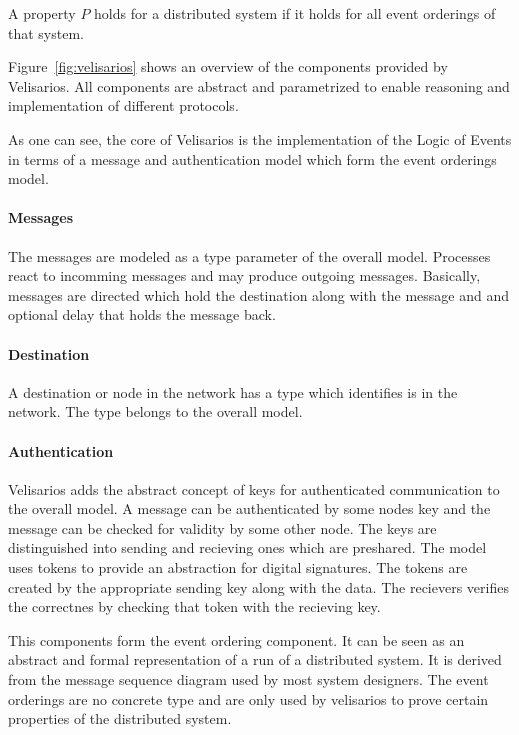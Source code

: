 \begin{defi}
  A property $P$ holds for a distributed system if it holds
  for all event orderings of that system.
\end{defi}

Figure~\ref{fig:velisarios} shows an overview of the components provided
by Velisarios. All components are abstract and parametrized to enable
reasoning and implementation of different protocols.~\cite{rahli2018velisarios}

As one can see, the core of Velisarios is the implementation of the Logic of
Events in terms of a message and authentication model which form
the event orderings model.~\cite{rahli2018velisarios}

\paragraph*{Messages}
The messages are modeled as a type parameter  of the overall model.
Processes react to incomming messages and may produce outgoing messages.
Basically, messages are directed which hold the destination along with
the message and and optional delay that holds the message back.~\cite{rahli2018velisarios}

\paragraph*{Destination}
A destination or node in the network has a type  which
identifies is in the network. The type belongs to the overall model.~\cite{rahli2018velisarios}

\paragraph*{Authentication}
Velisarios adds the abstract concept of keys for authenticated communication
to the overall model. A message can be authenticated by some nodes key
and the message can be checked for validity by some other node. The keys
are distinguished into sending and recieving ones which are preshared.
The model uses tokens to provide an abstraction for digital signatures.
The tokens are created by the appropriate sending key along with the data.
The recievers verifies the correctnes by checking that token with the recieving
key.~\cite{rahli2018velisarios}

This components form the event ordering component. It can be seen
as an abstract and formal representation of a run of a distributed system.
It is derived from the message sequence diagram used by most system designers.
The event orderings are no concrete type and are only used by velisarios
to prove certain properties of the distributed system.~\cite{rahli2018velisarios}


